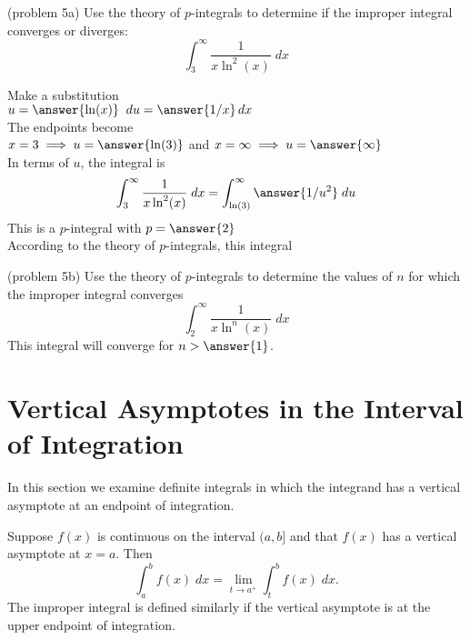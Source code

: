 \documentclass{ximera}
\begin{document}
\begin{problem}(problem 5a)
Use the theory of $p$-integrals to determine if the improper integral converges or diverges:
\[
\int_3^\infty \frac{1}{x\ln^2(x)} \; dx
\]

Make a substitution\\
$u = \answer{\ln(x)} \;\; du = \answer{1/x} \, dx$\\
The endpoints become\\
$x = 3 \implies u = \answer{\ln(3)}$ and $x= \infty \implies u = \answer{\infty}$\\
In terms of $u$, the integral is
\[
\int_3^\infty \frac{1}{x\ln^2(x)} \; dx = \int_{\ln(3)}^\infty \answer{1/u^2} \; du
\]
This is a $p$-integral with $p = \answer{2}$\\
According to the theory of $p$-integrals, this integral
\begin{multipleChoice}
\end{multipleChoice}
\end{problem}


\begin{problem}(problem 5b)
Use the theory of $p$-integrals to determine the values of $n$ for which the improper integral converges
\[
\int_2^\infty \frac{1}{x \ln^n(x)} \; dx
\]
This integral will converge for $n > \answer{1}$.
\end{problem}



\section{Vertical Asymptotes in the Interval of Integration}

In this section we examine definite integrals in which the integrand has a vertical asymptote at an endpoint of integration.

\begin{definition}
Suppose $f(x)$ is continuous on the interval $(a, b]$ and that $f(x)$ has a vertical asymptote at $x = a$.
Then
\[
\int_a^b f(x) \; dx = \lim_{t \to a^+} \int_t^b f(x) \; dx.
\]
The improper integral is defined similarly if the vertical asymptote is at the upper endpoint of integration.
\end{definition}
\end{document}
